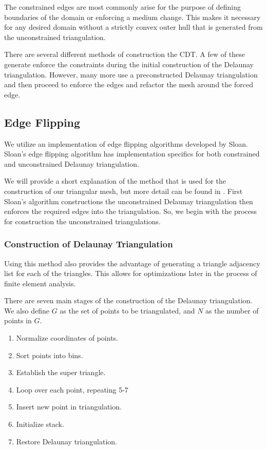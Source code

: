 \documentclass[../fem.tex]{subfiles}
\begin{document}
The constrained edges are most commonly arise for the purpose of defining
boundaries of the domain or enforcing a medium change. This makes it necessary
for any desired domain without a strictly convex outer hull that is generated
from the unconstrained triangulation.

There are several different methods of construction the CDT. A few of these
generate enforce the constraints during the initial construction of the
Delaunay triangulation. However, many more use a preconstructed Delaunay
triangulation and then proceed to enforce the edges and refactor the mesh
around the forced edge.

\subsection{Edge Flipping}%
\label{sub:edge_flipping}

We utilize an implementation of edge flipping algorithms developed by Sloan.
Sloan's edge flipping algorithm has implementation specifics for both
constrained and unconstrained Delaunay triangulation.

We will provide a short explanation of the method that is used for the
construction of our triangular mesh, but more detail can be found in
\cite{S_DT}\cite{S_CDT}. First Sloan's algorithm constructions the
unconstrained Delaunay triangulation then enforces the required edges into the
triangulation. So, we begin with the process for construction the unconstrained
triangulations.

\subsubsection{Construction of Delaunay Triangulation}%
\label{ssub:construction_of_delaunay_triangulation}

Using this method also provides the advantage of generating a triangle
adjacency list for each of the triangles. This allows for optimizations later
in the process of finite element analysis.

There are seven main stages of the construction of the Delaunay triangulation.
We also define $G$ as the set of points to be triangulated, and $N$ as the
number of points in $G$.

\begin{enumerate}[label=\arabic*.]
  \item Normalize coordinates of points.
  \item Sort points into bins.
  \item Establish the super triangle.
  \item Loop over each point, repeating 5-7
  \item Insert new point in triangulation.
  \item Initialize stack.
  \item Restore Delaunay triangulation.
\end{enumerate}
\end{document}
